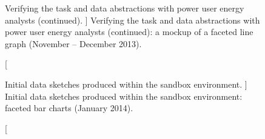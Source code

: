 

\begin{figure}
	\centering
	\caption
	[
	    Verifying the task and data abstractions with power user energy analysts (continued).
	]
	{
    	Verifying the task and data abstractions with power user energy analysts (continued): a mockup of a faceted line graph (November -- December 2013).  
	}
	\centering
	\label{app:emu:fig:verify-2}
\end{figure}



\begin{figure}
	\centering
	\caption
	[
	    Initial data sketches produced within the sandbox environment.
	]
	{
    	Initial data sketches produced within the sandbox environment: faceted bar charts (January 2014). 
	}
	\centering
	\label{app:emu:fig:initial-sketches}
\end{figure}


